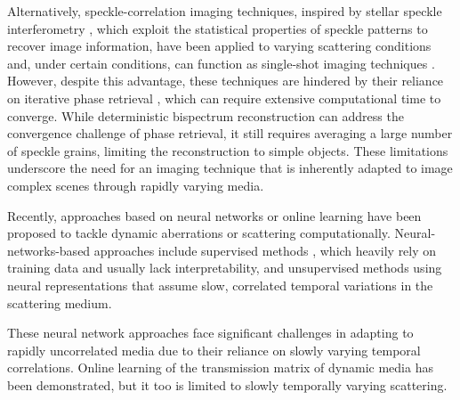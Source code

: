 \documentclass[pdflatex,sn-mathphys-num]{sn-jnl}%
\theoremstyle{thmstyleone}%
\theoremstyle{thmstyletwo}%
\theoremstyle{thmstylethree}%
\begin{document}
Alternatively, speckle-correlation imaging techniques, inspired by stellar speckle interferometry \cite{labeyrie1970attainment}, which exploit the statistical properties of speckle patterns to recover image information, have been applied to varying scattering conditions \cite{labeyrie1970attainment,rosenfeld2021acousto,wang2021non,zhang2023high,guo2023dynamic} and, under certain conditions, can function as single-shot imaging techniques \cite{bert12,katz14, edrei2016optical,salhov2018depth,wang2020imaging,zhu2024non,makowski2024low}. 
However, despite this advantage, these techniques are hindered by their reliance on iterative phase retrieval \cite{fienup1978reconstruction}, which can require extensive computational time to converge.
While deterministic bispectrum reconstruction \cite{wu2016single, hwang2019fast, he2023recursion, han2024single} can address the convergence challenge of phase retrieval, it still requires averaging a large number of speckle grains, limiting the reconstruction to simple objects.
These limitations underscore the need for an imaging technique that is inherently adapted to image complex scenes through rapidly varying media.

Recently, approaches based on neural networks or online learning have been proposed to tackle dynamic aberrations or scattering computationally. Neural-networks-based approaches include supervised methods \cite{sun2019image,liu2024learning}, which heavily rely on training data and usually lack interpretability, and unsupervised methods using neural representations \cite{feng23,xie2024wavemo} that assume slow, correlated temporal variations in the scattering medium. 

These neural network approaches face significant challenges in adapting to rapidly uncorrelated media due to their reliance on slowly varying temporal correlations. Online learning of the transmission matrix of dynamic media \cite{valzania2023online} has been demonstrated, but it too is limited to slowly temporally varying scattering.
\end{document}
